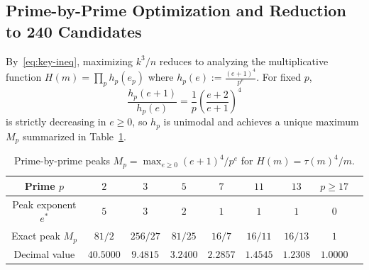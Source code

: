 \documentclass[11pt,a4paper]{article}
\theoremstyle{definition}
\theoremstyle{remark}
\begin{document}
\subsection{Prime-by-Prime Optimization and Reduction to 240 Candidates}

By~\eqref{eq:key-ineq}, maximizing $k^3/n$ reduces to analyzing the multiplicative function $H(m) = \prod_{p} h_p(e_p)$ where $h_p(e) := \frac{(e+1)^4}{p^e}$. For fixed $p$,
\[
  \frac{h_p(e+1)}{h_p(e)} = \frac{1}{p}\left(\frac{e+2}{e+1}\right)^4
\]
is strictly decreasing in $e \ge 0$, so $h_p$ is unimodal and achieves a unique maximum $M_p$ summarized in Table~\ref{tab:prime-peaks}.

\begin{table}[htbp]
\centering
\caption{Prime-by-prime peaks $M_p = \max_{e \ge 0} (e+1)^4/p^e$ for $H(m) = \tau(m)^4/m$.}
\label{tab:prime-peaks}
\begin{tabular}{@{}ccccccccc@{}}
\toprule
Prime $p$ & $2$ & $3$ & $5$ & $7$ & $11$ & $13$ & $p \ge 17$ \\
\midrule
Peak exponent $e^*$ & $5$ & $3$ & $2$ & $1$ & $1$ & $1$ & $0$ \\
Exact peak $M_p$ & $81/2$ & $256/27$ & $81/25$ & $16/7$ & $16/11$ & $16/13$ & $1$ \\
Decimal value & $40.5000$ & $9.4815$ & $3.2400$ & $2.2857$ & $1.4545$ & $1.2308$ & $1.0000$ \\
\bottomrule
\end{tabular}
\end{table}
\end{document}
